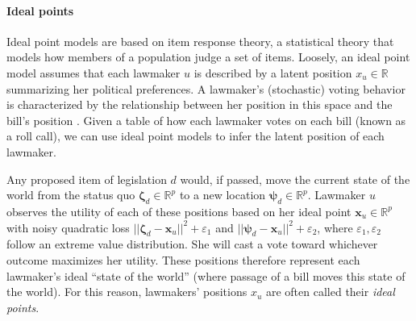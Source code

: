 \paragraph{Ideal points}


Ideal point models are based on item response theory, a statistical
theory that models how members of a population judge a set of items.
Loosely, an ideal point model assumes that each lawmaker $u$ is
described by a latent position $x_u \in \mathbb{R}$ summarizing her
political preferences.  A lawmaker's (stochastic) voting behavior is
characterized by the relationship between her position in this space
and the bill's position
\citep{poole:1985,poole:1991,jackman:2001,martin:2002,clinton:2004}.
Given a table of how each lawmaker votes on each bill (known as a roll
call), we can use ideal point models to infer the latent position of
each lawmaker.

Any proposed item of legislation $d$ would, if passed, move the
current state of the world from the status quo $\bm \zeta_d \in
\mathbb{R}^p$ to a new location $\bm \psi_d \in \mathbb{R}^p$.
Lawmaker $u$ observes the utility of each of these positions based on
her ideal point $\bm x_u \in \mathbb{R}^p$ with noisy quadratic loss
$|| \bm \zeta_d - \bm x_u ||^2 + \varepsilon_1$ and $|| \bm \psi_d -
\bm x_u ||^2 + \varepsilon_2$, where $\varepsilon_1, \varepsilon_2$
follow an extreme value distribution.  She will cast a vote toward
whichever outcome maximizes her utility.  These positions
therefore represent each lawmaker's ideal ``state of the world''
(where passage of a bill moves this state of the world).  For this
reason, lawmakers' positions $x_u$ are often called their \emph{ideal
  points}.

